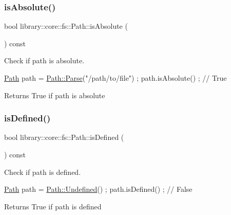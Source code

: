 \subsubsection{\texorpdfstring{is\+Absolute()}{isAbsolute()}}
{\footnotesize\ttfamily bool library\+::core\+::fs\+::\+Path\+::is\+Absolute (\begin{DoxyParamCaption}{ }\end{DoxyParamCaption}) const}



Check if path is absolute. 


\begin{DoxyCode}
\hyperlink{classlibrary_1_1core_1_1fs_1_1_path_aaba9a8e0153813f08f78f1c3275734a4}{Path} path = \hyperlink{classlibrary_1_1core_1_1fs_1_1_path_aebf5bd3af83e0b7376616e146f3e55df}{Path::Parse}(\textcolor{stringliteral}{"/path/to/file"}) ;
path.isAbsolute() ; \textcolor{comment}{// True}
\end{DoxyCode}


\begin{DoxyReturn}{Returns}
True if path is absolute 
\end{DoxyReturn}
\mbox{\label{classlibrary_1_1core_1_1fs_1_1_path_a4315cfd12f61bf477e010f33122c3d0c}} 
\subsubsection{\texorpdfstring{is\+Defined()}{isDefined()}}
{\footnotesize\ttfamily bool library\+::core\+::fs\+::\+Path\+::is\+Defined (\begin{DoxyParamCaption}{ }\end{DoxyParamCaption}) const}



Check if path is defined. 


\begin{DoxyCode}
\hyperlink{classlibrary_1_1core_1_1fs_1_1_path_aaba9a8e0153813f08f78f1c3275734a4}{Path} path = \hyperlink{classlibrary_1_1core_1_1fs_1_1_path_a89cddd92be70121f2537726d69ca6499}{Path::Undefined}() ;
path.isDefined() ; \textcolor{comment}{// False}
\end{DoxyCode}


\begin{DoxyReturn}{Returns}
True if path is defined 
\end{DoxyReturn}
\mbox{\label{classlibrary_1_1core_1_1fs_1_1_path_a97cf61b699efe17e23ac3a91daf897e2}} 

